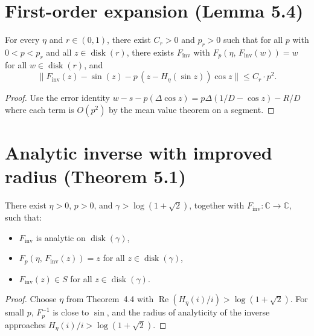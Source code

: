 \chapter{First-order expansion (Lemma 5.4)}

\begin{lemma}[Lemma 5.4]
  \label{lem:5_4}
  \leanok
  For every $\eta$ and $r \in (0,1)$, there exist $C_r > 0$ and $p_r > 0$ such that
  for all $p$ with $0 < p < p_r$ and all $z \in \operatorname{disk}(r)$, there exists
  $F_{\mathrm{inv}}$ with $F_p(\eta,\, F_{\mathrm{inv}}(w)) = w$ for all $w \in \operatorname{disk}(r)$, and
  \[
    \|F_{\mathrm{inv}}(z) - \sin(z) - p\,(z - H_\eta(\sin z))\cos z\| \leq C_r \cdot p^2.
  \]
\end{lemma}

\begin{proof}
  \leanok
  Use the error identity $w - s - p(\Delta \cos z) = p\Delta(1/D - \cos z) - R/D$
  where each term is $O(p^2)$ by the mean value theorem on a segment.
\end{proof}

\chapter{Analytic inverse with improved radius (Theorem 5.1)}

\begin{theorem}[Theorem 5.1]
  \label{thm:5_1}
  \leanok
  There exist $\eta > 0$, $p > 0$, and $\gamma > \log(1+\sqrt{2})$, together with
  $F_{\mathrm{inv}} : \mathbb{C} \to \mathbb{C}$, such that:
  \begin{itemize}
    \item $F_{\mathrm{inv}}$ is analytic on $\operatorname{disk}(\gamma)$,
    \item $F_p(\eta,\, F_{\mathrm{inv}}(z)) = z$ for all $z \in \operatorname{disk}(\gamma)$,
    \item $F_{\mathrm{inv}}(z) \in S$ for all $z \in \operatorname{disk}(\gamma)$.
  \end{itemize}
\end{theorem}

\begin{proof}
  \leanok
  Choose $\eta$ from Theorem~4.4 with $\operatorname{Re}(H_\eta(i)/i) > \log(1+\sqrt{2})$.
  For small $p$, $F_p^{-1}$ is close to $\sin$, and the radius of analyticity of
  the inverse approaches $H_\eta(i)/i > \log(1+\sqrt{2})$.
\end{proof}

